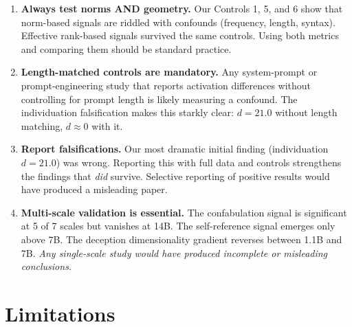 \documentclass[11pt,a4paper]{article}
\begin{document}
\begin{enumerate}[leftmargin=*]
    \item \textbf{Always test norms AND geometry.} Our Controls 1, 5, and 6 show that norm-based signals are riddled with confounds (frequency, length, syntax). Effective rank-based signals survived the same controls. Using both metrics and comparing them should be standard practice.

    \item \textbf{Length-matched controls are mandatory.} Any system-prompt or prompt-engineering study that reports activation differences without controlling for prompt length is likely measuring a confound. The individuation falsification makes this starkly clear: $d = 21.0$ without length matching, $d \approx 0$ with it.

    \item \textbf{Report falsifications.} Our most dramatic initial finding (individuation $d = 21.0$) was wrong. Reporting this with full data and controls strengthens the findings that \emph{did} survive. Selective reporting of positive results would have produced a misleading paper.

    \item \textbf{Multi-scale validation is essential.} The confabulation signal is significant at 5 of 7 scales but vanishes at 14B. The self-reference signal emerges only above 7B. The deception dimensionality gradient reverses between 1.1B and 7B. \emph{Any single-scale study would have produced incomplete or misleading conclusions.}
\end{enumerate}

\section{Limitations}
\label{sec:limitations}
\end{document}
